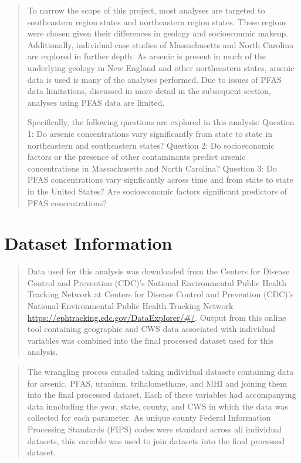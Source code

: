 \documentclass[12pt,]{article}
\begin{document}
\begin{quote}
To narrow the scope of this project, most analyses are targeted to
southeastern region states and northeastern region states. These regions
were chosen given their differences in geology and socioeconmic makeup.
Additionally, individual case studies of Massachusetts and North
Carolina are explored in further depth. As arsenic is present in much of
the underlying geology in New England and other northeastern states,
arsenic data is used is many of the analyses performed. Due to issues of
PFAS data limitations, discussed in more detail in the subsequent
section, analyses using PFAS data are limited.

Specifically, the following questions are explored in this analysis:
Question 1: Do arsenic concentrations vary significantly from state to
state in northeastern and southeastern states? Question 2: Do
socioeconomic factors or the presence of other contaminants predict
arsenic concentrations in Massachusetts and North Carolina? Question 3:
Do PFAS concentrations vary signficantly across time and from state to
state in the United States? Are socioeconomic factors significant
predictors of PFAS concentrations?
\end{quote}

\newpage

\hypertarget{dataset-information}{%
\section{Dataset Information}\label{dataset-information}}

\begin{quote}
Data used for this analysis was downloaded from the Centers for Disease
Control and Prevention (CDC)'s National Environmental Public Health
Tracking Network at Centers for Disease Control and Prevention (CDC)'s
National Environmental Public Health Tracking Network
\url{https://ephtracking.cdc.gov/DataExplorer/\#/}. Output from this
online tool containing geographic and CWS data associated with
individual variables was combined into the final processed dataset used
for this analysis.
\end{quote}

\begin{quote}
The wrangling process entailed taking individual datasets containing
data for arsenic, PFAS, uranium, trihalomethane, and MHI and joining
them into the final processed dataset. Each of these variables had
accompanying data inncluding the year, state, county, and CWS in which
the data was collected for each parameter. As unique county Federal
Information Processing Standards (FIPS) codes were standard across all
individual datasets, this variable was used to join datasets into the
final processed dataset.
\end{quote}
\end{document}
